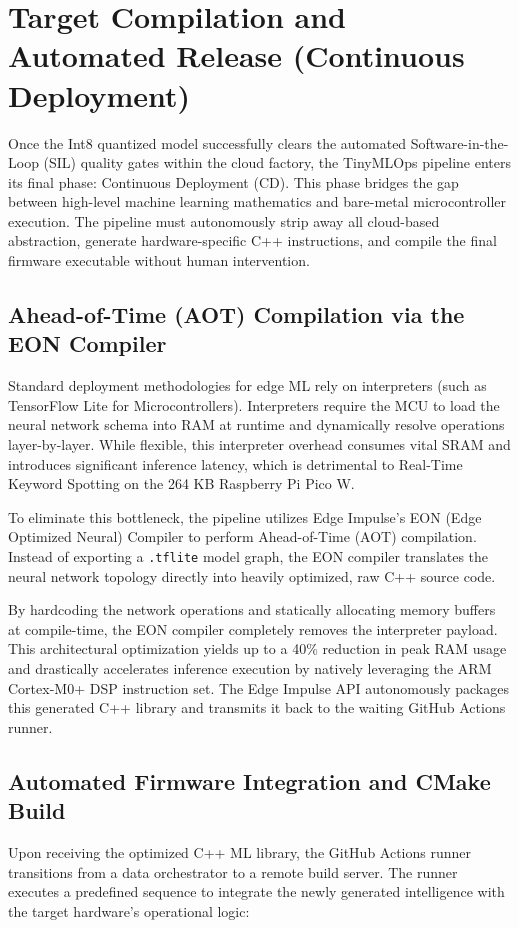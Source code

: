 \documentclass[11pt,a4paper,openany]{book}
\begin{document}
\section{Target Compilation and Automated Release (Continuous Deployment)}

Once the Int8 quantized model successfully clears the automated Software-in-the-Loop (SIL) quality gates within the cloud factory, the TinyMLOps pipeline enters its final phase: Continuous Deployment (CD). This phase bridges the gap between high-level machine learning mathematics and bare-metal microcontroller execution. The pipeline must autonomously strip away all cloud-based abstraction, generate hardware-specific C++ instructions, and compile the final firmware executable without human intervention.

\subsection{Ahead-of-Time (AOT) Compilation via the EON\texttrademark{} Compiler}
Standard deployment methodologies for edge ML rely on interpreters (such as TensorFlow Lite for Microcontrollers). Interpreters require the MCU to load the neural network schema into RAM at runtime and dynamically resolve operations layer-by-layer. While flexible, this interpreter overhead consumes vital SRAM and introduces significant inference latency, which is detrimental to Real-Time Keyword Spotting on the 264 KB Raspberry Pi Pico W.

To eliminate this bottleneck, the pipeline utilizes Edge Impulse's EON (Edge Optimized Neural) Compiler to perform Ahead-of-Time (AOT) compilation. Instead of exporting a \texttt{.tflite} model graph, the EON compiler translates the neural network topology directly into heavily optimized, raw C++ source code.

By hardcoding the network operations and statically allocating memory buffers at compile-time, the EON compiler completely removes the interpreter payload. This architectural optimization yields up to a 40\% reduction in peak RAM usage and drastically accelerates inference execution by natively leveraging the ARM Cortex-M0+ DSP instruction set. The Edge Impulse API autonomously packages this generated C++ library and transmits it back to the waiting GitHub Actions runner.

\subsection{Automated Firmware Integration and CMake Build}
Upon receiving the optimized C++ ML library, the GitHub Actions runner transitions from a data orchestrator to a remote build server. The runner executes a predefined sequence to integrate the newly generated intelligence with the target hardware's operational logic:
\end{document}
